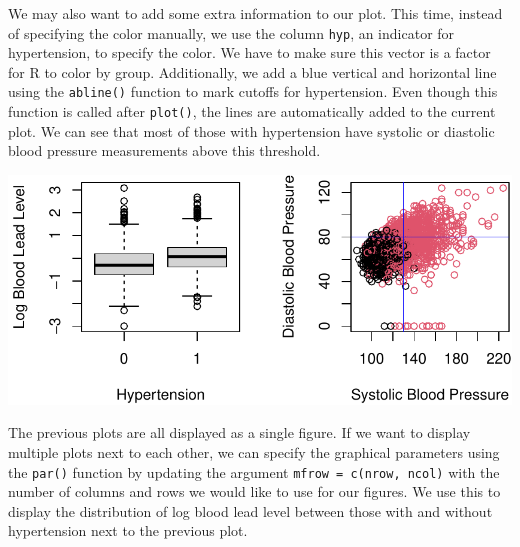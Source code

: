 \documentclass[
  letterpaper,
]{latex/krantz}
\makeatletter
\newenvironment{Shaded}{\begin{snugshade}}{\end{snugshade}}
\newcommand{\AttributeTok}[1]{\textcolor[rgb]{0.40,0.45,0.13}{#1}}
\newcommand{\DecValTok}[1]{\textcolor[rgb]{0.68,0.00,0.00}{#1}}
\newcommand{\FunctionTok}[1]{\textcolor[rgb]{0.28,0.35,0.67}{#1}}
\newcommand{\NormalTok}[1]{\textcolor[rgb]{0.00,0.23,0.31}{#1}}
\newcommand{\SpecialCharTok}[1]{\textcolor[rgb]{0.37,0.37,0.37}{#1}}
\newcommand{\StringTok}[1]{\textcolor[rgb]{0.13,0.47,0.30}{#1}}
\newenvironment{kframe}{%
\medskip{}
\setlength{\fboxsep}{.8em}
 \def\at@end@of@kframe{}%
 \ifinner\ifhmode%
  \def\at@end@of@kframe{\end{minipage}}%
  \begin{minipage}{\columnwidth}%
 \fi\fi%
 \def\FrameCommand##1{\hskip\@totalleftmargin \hskip-\fboxsep
 \colorbox{shadecolor}{##1}\hskip-\fboxsep
     \hskip-\linewidth \hskip-\@totalleftmargin \hskip\columnwidth}%
 \MakeFramed {\advance\hsize-\width
   \@totalleftmargin\z@ \linewidth\hsize
   \@setminipage}}%
 {\par\unskip\endMakeFramed%
 \at@end@of@kframe}
\renewenvironment{Shaded}{\begin{kframe}}{\end{kframe}}
\makeatother
\begin{document}
We may also want to add some extra information to our plot. This time,
instead of specifying the color manually, we use the column
\texttt{hyp}, an indicator for hypertension, to specify the color. We
have to make sure this vector is a factor for R to color by group.
Additionally, we add a blue vertical and horizontal line using the
\texttt{abline()} function
to mark cutoffs for hypertension. Even though this function is called
after \texttt{plot()}, the lines are automatically added to the current
plot. We can see that most of those with hypertension have systolic or
diastolic blood pressure measurements above this threshold.

\begin{Shaded}
\end{Shaded}

\begin{center}
\includegraphics[width=1\textwidth,height=\textheight]{book/exploratory_analysis_files/figure-pdf/unnamed-chunk-20-1.pdf}
\end{center}

\newpage

The previous plots are all displayed as a single
figure. If we want to display multiple
plots next to each other, we can specify the graphical parameters using
the \texttt{par()} function by
updating the argument \texttt{mfrow\ =\ c(nrow,\ ncol)} with the number
of columns and rows we would like to use for our figures. We use this to
display the distribution of log blood lead level between those with and
without hypertension next to the previous plot.
\end{document}

